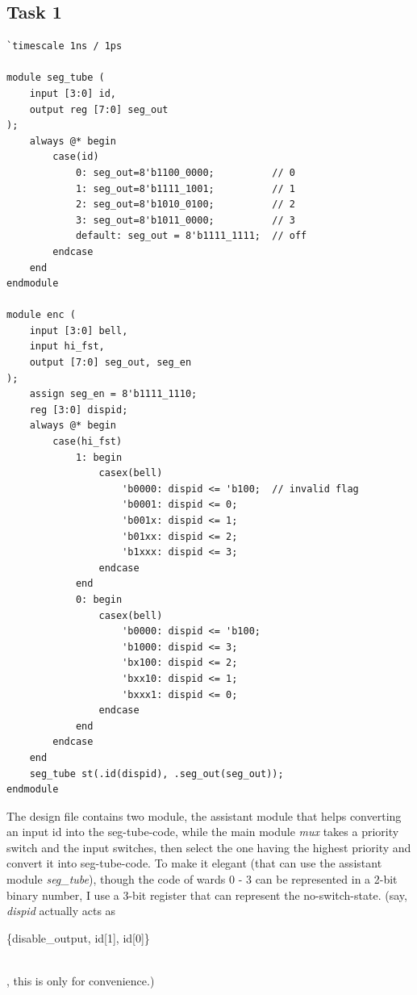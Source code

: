 \documentclass[onecolumn, oneside, ctexart]{SUSTechHomework}
\begin{document}
\subsection{Task 1}
\begin{lstlisting}
`timescale 1ns / 1ps

module seg_tube (
    input [3:0] id,
    output reg [7:0] seg_out
);
    always @* begin
        case(id)
            0: seg_out=8'b1100_0000;          // 0
            1: seg_out=8'b1111_1001;          // 1
            2: seg_out=8'b1010_0100;          // 2
            3: seg_out=8'b1011_0000;          // 3
            default: seg_out = 8'b1111_1111;  // off
        endcase
    end
endmodule

module enc (
    input [3:0] bell,
    input hi_fst,
    output [7:0] seg_out, seg_en
);
    assign seg_en = 8'b1111_1110;
    reg [3:0] dispid;
    always @* begin
        case(hi_fst)
            1: begin
                casex(bell)
                    'b0000: dispid <= 'b100;  // invalid flag
                    'b0001: dispid <= 0;
                    'b001x: dispid <= 1;
                    'b01xx: dispid <= 2;
                    'b1xxx: dispid <= 3;
                endcase
            end
            0: begin
                casex(bell)
                    'b0000: dispid <= 'b100;
                    'b1000: dispid <= 3;
                    'bx100: dispid <= 2;
                    'bxx10: dispid <= 1;
                    'bxxx1: dispid <= 0;
                endcase
            end
        endcase
    end
    seg_tube st(.id(dispid), .seg_out(seg_out));
endmodule

\end{lstlisting}
\vspace{-3em}
\par The design file contains two module, the assistant module that helps converting an input id into the seg-tube-code, while the main module \emph{mux} takes a priority switch and the input switches, then select the one having the highest priority and convert it into seg-tube-code. To make it elegant (that can use the assistant module \textit{seg\_tube}), though the code of wards 0 - 3 can be represented in a 2-bit binary number, I use a 3-bit register that can represent the no-switch-state. (say, \emph{dispid} actually acts as \\\centerline{\{disable\_output, id[1], id[0]\}}\\, this is only for convenience.)\\
\end{document}

